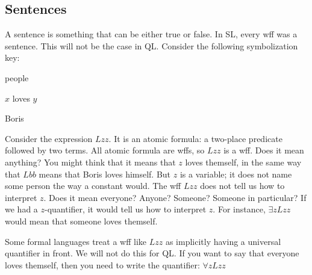 






\subsection{Sentences}

A {sentence} is something that can be either true or false. In SL, every wff was a sentence. This will not be the case in QL. Consider the following symbolization key:
\begin{ekey}
\item[UD:] people
\item[Lxy:] $x$ loves $y$
\item[b:] Boris
\end{ekey}
Consider the expression $Lzz$. It is an atomic formula: a two-place predicate followed by two terms. All atomic formula are wffs, so $Lzz$ is a wff. Does it mean anything? You might think that it means that $z$ loves themself, in the same way that $Lbb$ means that Boris loves himself. But $z$ is a variable; it does not name some person the way a constant would. The wff $Lzz$ does not tell us how to interpret $z$. Does it mean everyone? Anyone? Someone? Someone in particular? If we had a $z$-quantifier, it would tell us how to interpret $z$. For instance, $\exists zLzz$ would mean that someone loves themself.

Some formal languages treat a wff like $Lzz$ as implicitly having a universal quantifier in front. We will not do this for QL. If you want to say that everyone loves themself, then you need to write the quantifier: $\forall zLzz$

